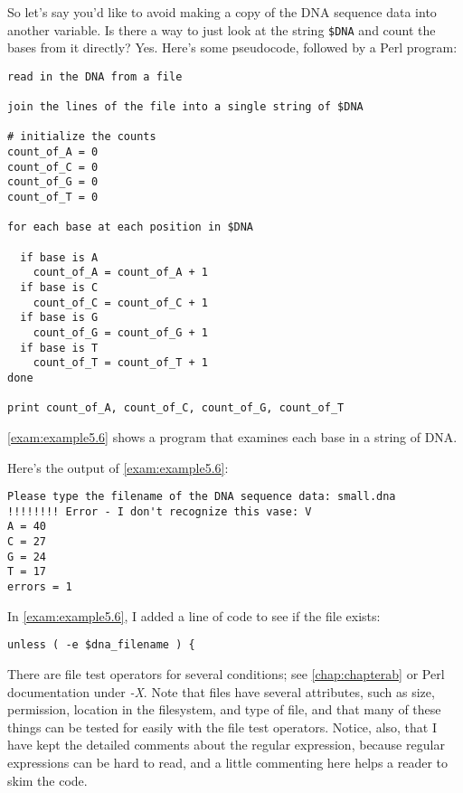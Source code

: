 So let's say you'd like to avoid making a copy of the DNA sequence data into another variable. Is there a way to just look at the string \verb|$DNA| and count the bases from it directly? Yes. Here's some pseudocode, followed by a Perl program: 

\begin{lstlisting}
read in the DNA from a file

join the lines of the file into a single string of $DNA

# initialize the counts
count_of_A = 0
count_of_C = 0
count_of_G = 0
count_of_T = 0

for each base at each position in $DNA

  if base is A
    count_of_A = count_of_A + 1
  if base is C
    count_of_C = count_of_C + 1
  if base is G
    count_of_G = count_of_G + 1
  if base is T
    count_of_T = count_of_T + 1
done

print count_of_A, count_of_C, count_of_G, count_of_T
\end{lstlisting}

\autoref{exam:example5.6} shows a program that examines each base in a string of DNA. 


Here's the output of \autoref{exam:example5.6}:

\begin{lstlisting}
Please type the filename of the DNA sequence data: small.dna
!!!!!!!! Error - I don't recognize this vase: V
A = 40
C = 27
G = 24
T = 17
errors = 1
\end{lstlisting}

In \autoref{exam:example5.6}, I added a line of code to see if the file exists:

\begin{lstlisting}
unless ( -e $dna_filename ) {
\end{lstlisting}

There are file test operators for several conditions; see \autoref{chap:chapterab} or Perl documentation under \textit{-X}. Note that files have several attributes, such as size, permission, location in the filesystem, and type of file, and that many of these things can be tested for easily with the file test operators.  
Notice, also, that I have kept the detailed comments about the regular expression, because regular expressions can be hard to read, and a little commenting here helps a reader to skim the code.

